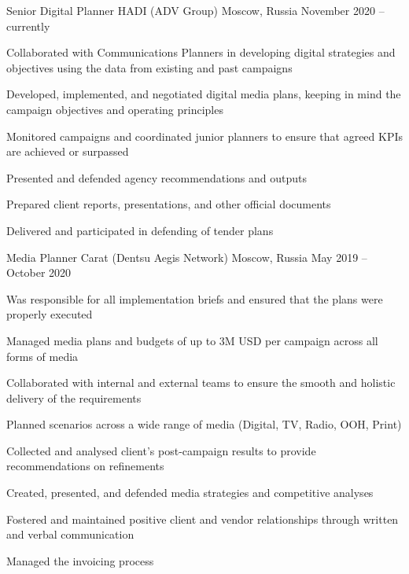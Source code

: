 \documentclass[11pt, a4paper]{awesome-cv}
\begin{document}
\begin{cventries}
\cventry
	{Senior Digital Planner}
	{HADI (ADV Group)}
	{Moscow, Russia}
	{November 2020 -- currently}
	{
		\begin{cvitems}
			\item {Collaborated with Communications Planners in developing digital strategies and objectives using the data from existing and past campaigns}
			\item {Developed, implemented, and negotiated digital media plans, keeping in mind the campaign objectives and operating principles}
			\item {Monitored campaigns and coordinated junior planners to ensure that agreed KPIs are achieved or surpassed}
			\item {Presented and defended agency recommendations and outputs}
			\item {Prepared client reports, presentations, and other official documents}
			\item {Delivered and participated in defending of tender plans}
		\end{cvitems}
	}

\cventry
	{Media Planner}
	{Carat (Dentsu Aegis Network)}
	{Moscow, Russia}
	{May 2019 -- October 2020}
	{
		\begin{cvitems}
			\item {Was responsible for all implementation briefs and ensured that the plans were properly executed}
			\item {Managed media plans and budgets of up to 3M USD per campaign across all forms of media}
			\item {Collaborated with internal and external teams to ensure the smooth and holistic delivery of the requirements}
			\item {Planned scenarios across a wide range of media (Digital, TV, Radio, OOH, Print)}
			\item {Collected and analysed client's post-campaign results to provide recommendations on refinements}
			\item {Created, presented, and defended media strategies and competitive analyses}
			\item {Fostered and maintained positive client and vendor relationships through written and verbal communication}
			\item {Managed the invoicing process}
		\end{cvitems}
	}
	

\end{cventries}
\end{document}
